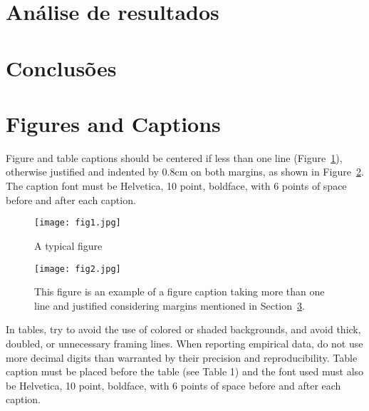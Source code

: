 \documentclass[12pt]{article}
\begin{document}
\section{Análise de resultados} \label{sec:results}



\section{Conclusões} \label{sec:conclusions}




\section{Figures and Captions}\label{sec:figs}

Figure and table captions should be centered if less than one line
(Figure~\ref{fig:exampleFig1}), otherwise justified and indented by 0.8cm on
both margins, as shown in Figure~\ref{fig:exampleFig2}. The caption font must
be Helvetica, 10 point, boldface, with 6 points of space before and after each
caption.

\begin{figure}[ht]
\centering
\texttt{[image: fig1.jpg]}
\caption{A typical figure}
\label{fig:exampleFig1}
\end{figure}

\begin{figure}[ht]
\centering
\texttt{[image: fig2.jpg]}
\caption{This figure is an example of a figure caption taking more than one
  line and justified considering margins mentioned in Section~\ref{sec:figs}.}
\label{fig:exampleFig2}
\end{figure}

In tables, try to avoid the use of colored or shaded backgrounds, and avoid
thick, doubled, or unnecessary framing lines. When reporting empirical data,
do not use more decimal digits than warranted by their precision and
reproducibility. Table caption must be placed before the table (see Table 1)
and the font used must also be Helvetica, 10 point, boldface, with 6 points of
space before and after each caption.
\end{document}
